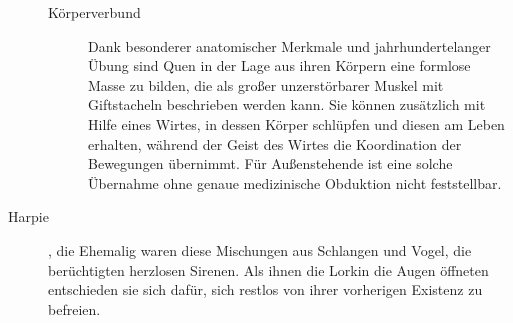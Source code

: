 \documentclass[a4paper,12pt,oneside]{book}
\begin{document}
\begin{description}
\begin{description}
\item[Körperverbund]Dank besonderer anatomischer Merkmale und jahrhundertelanger Übung sind Quen in der Lage aus ihren Körpern eine formlose Masse zu bilden, die als großer unzerstörbarer Muskel mit Giftstacheln beschrieben werden kann. Sie können zusätzlich mit Hilfe eines Wirtes, in dessen Körper schlüpfen und diesen am Leben erhalten, während der Geist des Wirtes die Koordination der Bewegungen übernimmt. Für Außenstehende ist eine solche Übernahme ohne genaue medizinische Obduktion nicht feststellbar.
\end{description}

\item[Harpie], die
Ehemalig waren diese Mischungen aus Schlangen und Vogel, die berüchtigten herzlosen Sirenen. Als ihnen die Lorkin die Augen öffneten entschieden sie sich dafür, sich restlos von ihrer vorherigen Existenz zu befreien. 

\end{description}
\end{document}
